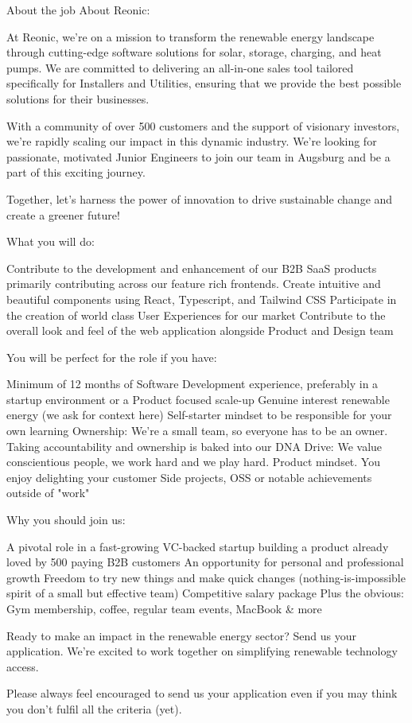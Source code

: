 About the job
About Reonic:



At Reonic, we’re on a mission to transform the renewable energy landscape through cutting-edge software solutions for solar, storage, charging, and heat pumps. We are committed to delivering an all-in-one sales tool tailored specifically for Installers and Utilities, ensuring that we provide the best possible solutions for their businesses.



With a community of over 500 customers and the support of visionary investors, we’re rapidly scaling our impact in this dynamic industry. We're looking for passionate, motivated Junior Engineers to join our team in Augsburg and be a part of this exciting journey.



Together, let’s harness the power of innovation to drive sustainable change and create a greener future!



What you will do:



Contribute to the development and enhancement of our B2B SaaS products primarily contributing across our feature rich frontends.
Create intuitive and beautiful components using React, Typescript, and Tailwind CSS
Participate in the creation of world class User Experiences for our market
Contribute to the overall look and feel of the web application alongside Product and Design team


You will be perfect for the role if you have:



Minimum of 12 months of Software Development experience, preferably in a startup environment or a Product focused scale-up
Genuine interest renewable energy (we ask for context here)
Self-starter mindset to be responsible for your own learning
Ownership: We're a small team, so everyone has to be an owner. Taking accountability and ownership is baked into our DNA
Drive: We value conscientious people, we work hard and we play hard.
Product mindset. You enjoy delighting your customer
Side projects, OSS or notable achievements outside of "work"


Why you should join us:



A pivotal role in a fast-growing VC-backed startup building a product already loved by 500 paying B2B customers
An opportunity for personal and professional growth
Freedom to try new things and make quick changes (nothing-is-impossible spirit of a small but effective team)
Competitive salary package
Plus the obvious: Gym membership, coffee, regular team events, MacBook & more


Ready to make an impact in the renewable energy sector? Send us your application. We’re excited to work together on simplifying renewable technology access.



Please always feel encouraged to send us your application even if you may think you don’t fulfil all the criteria (yet).